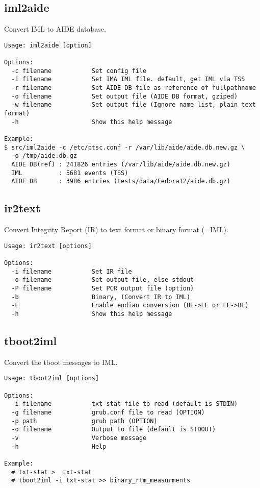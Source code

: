 \subsection{iml2aide} 

Convert IML to AIDE database.

\begin{lstlisting}[style=help_message]
Usage: iml2aide [option]

Options:
  -c filename           Set config file
  -i filename           Set IMA IML file. default, get IML via TSS
  -r filename           Set AIDE DB file as reference of fullpathname
  -o filename           Set output file (AIDE DB format, gziped)
  -w filename           Set output file (Ignore name list, plain text format)
  -h                    Show this help message

Example:
$ src/iml2aide -c /etc/ptsc.conf -r /var/lib/aide/aide.db.new.gz \
  -o /tmp/aide.db.gz
  AIDE DB(ref) : 241826 entries (/var/lib/aide/aide.db.new.gz)
  IML          : 5681 events (TSS)
  AIDE DB      : 3986 entries (tests/data/Fedora12/aide.db.gz) 
\end{lstlisting}


\subsection{ir2text}

Convert Integrity Report (IR) to text format or binary format (=IML).

\begin{lstlisting}[style=help_message]
Usage: ir2text [options]

Options:
  -i filename           Set IR file
  -o filename           Set output file, else stdout
  -P filename           Set PCR output file (option)
  -b                    Binary, (Convert IR to IML)
  -E                    Enable endian conversion (BE->LE or LE->BE)
  -h                    Show this help message
\end{lstlisting}

\subsection{tboot2iml}

Convert the tboot messages to IML.

\begin{lstlisting}[style=help_message]
Usage: tboot2iml [options]

Options:
  -i filename           txt-stat file to read (default is STDIN)
  -g filename           grub.conf file to read (OPTION)
  -p path               grub path (OPTION)
  -o filename           Output to file (default is STDOUT)
  -v                    Verbose message
  -h                    Help

Example:
  # txt-stat >  txt-stat
  # tboot2iml -i txt-stat >> binary_rtm_measurments

\end{lstlisting}



